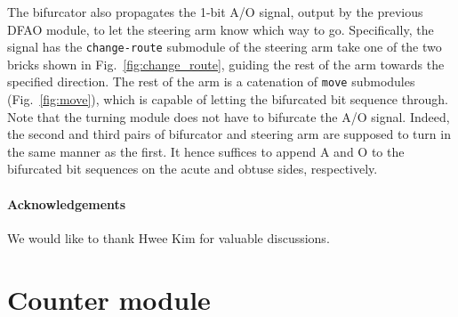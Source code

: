 \documentclass[runningheads]{llncs}
\begin{document}
The bifurcator also propagates the 1-bit A/O signal, output by the previous DFAO module, to let the steering arm know which way to go. 
Specifically, the signal has the \texttt{change-route} submodule of the steering arm take one of the two bricks shown in Fig.~\ref{fig:change_route}, guiding the rest of the arm towards the specified direction. 
The rest of the arm is a catenation of \texttt{move} submodules (Fig.~\ref{fig:move}), which is capable of letting the bifurcated bit sequence through. 
Note that the turning module does not have to bifurcate the A/O signal. 
Indeed, the second and third pairs of bifurcator and steering arm are supposed to turn in the same manner as the first. 
It hence suffices to append A and O to the bifurcated bit sequences on the acute and obtuse sides, respectively. 

\paragraph{Acknowledgements} 
We would like to thank Hwee Kim for valuable discussions. 


	
	

\clearpage

	\newpage
	\appendix



	\section{Counter module}
	\label{sect:appendix_counter_module}
\end{document}
